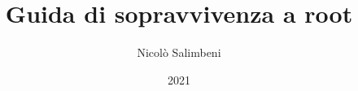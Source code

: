 \documentclass[a4paper,12pt]{book}
\begin{document}
\author{Nicolò Salimbeni}
\title{Guida di sopravvivenza a root}
\date{2021}

\mainmatter %
\maketitle  %
\tableofcontents  %





\end{document}
